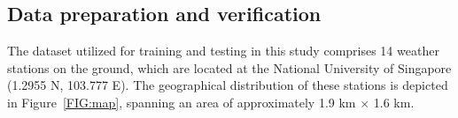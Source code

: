 \documentclass[a4paper,fleqn]{cas-sc}
\begin{document}

\subsection{Data preparation and verification}\label{datapre}

The dataset utilized for training and testing in this study comprises 14 weather stations on the ground, which are located at the National University of Singapore (1.2955 N, 103.777 E). The geographical distribution of these stations is depicted in Figure~\ref{FIG:map}, spanning an area of approximately 1.9 km $\times$ 1.6 km. 

\end{document}
